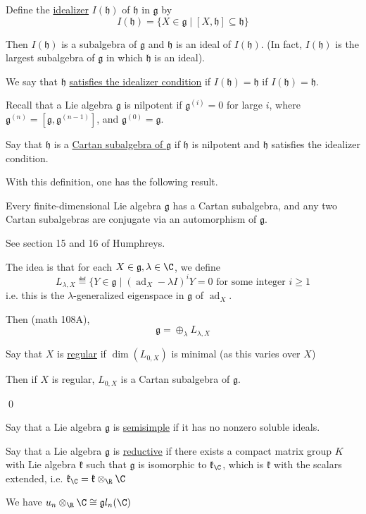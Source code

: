 \documentclass[x11names,reqno,14pt]{extarticle}
\newcommand{\mk}[1]{\mathfrak{#1}}
\newcommand{\g}{\mk{g}}
\newcommand{\h}{\mk{h}}
\DeclareMathOperator{\ad}{ad}
\begin{document}
Define the \underline{idealizer} $I(\h)$ of $\h$ in $\g$ by 
\[
I(\h) = \{X\in \g \mid [X, \h]\subseteq\h \}
\]

Then $I(\h)$ is a subalgebra of $\g$ and $\h$ is an ideal of $I(\h)$. (In fact, $I(\h)$ is the largest subalgebra of $\g$ in which $\h$ is an ideal). 

We say that $\h$ \underline{satisfies the idealizer condition} if $I(\h) = \h$ if $I(\h) = \h$. 

Recall that a Lie algebra $\g$ is nilpotent if $\g^(i) = 0$ for large $i$, where $\g^(n) = [\g, \g^{(n-1)}]$, and $\g^{(0)} = \g$.


Say that $\h$ is a \underline{Cartan subalgebra of $\g$} if $\h$ is nilpotent and $\h$ satisfies the idealizer condition. 

With this definition, one has the following result. 

\thm

Every finite-dimensional Lie algebra $\g$ has a Cartan subalgebra, and any two Cartan subalgebras are conjugate via an automorphism of $\g$. 

\proof 

See section 15 and 16 of Humphreys.  

The idea is that for each $X \in \g, \lambda\in\C$, we define 
\[
L_{\lambda,X} \eqdef \{Y \in \g \mid (\ad_X-\lambda I)^iY = 0\text{ for some integer $i\geq1$} 
\]
i.e. this is the $\lambda$-generalized eigenspace in $\g$ of $\ad_X$. 

Then (math 108A), 
\[
\g = \oplus_{\lambda}L_{\lambda,X}
\]

Say that $X$ is \underline{regular} if $\dim(L_{0,X})$ is minimal (as this varies over $X$) 

Then if $X$ is regular, $L_{0,X}$ is a Cartan subalgebra of $\g$. 

\qed


Say that a Lie algebra $\g$ is \underline{semisimple} if it has no nonzero soluble ideals. 


Say that a Lie algebra $\g$ is \underline{reductive} if there exists a compact matrix group $K$ with Lie algebra $\mk{k}$ such that $\g$ is isomorphic to $\mk{k}_\C$, which is $\mk{k}$ with the scalars extended, i.e. $\mk{k}_\C = \mk{k}\otimes_\R\C$

\exm

We have $u_n\otimes_\R\C\cong\g l_n(\C)$
\end{document}
